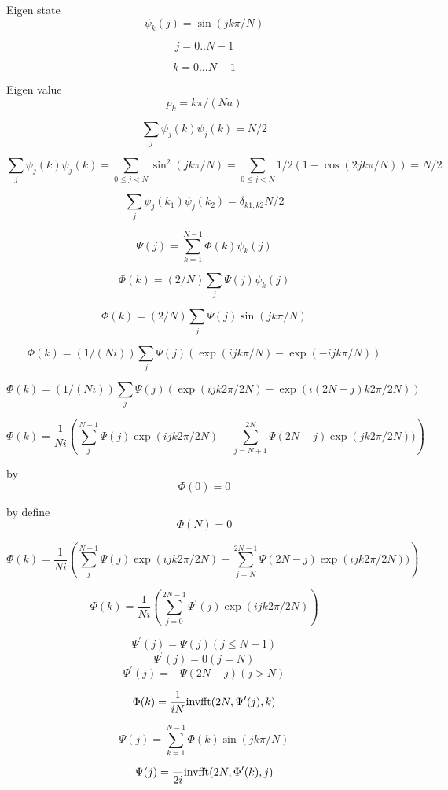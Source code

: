 \documentclass[12pt,twoside]{article}
\begin{document}
Eigen state
$$
\psi_k(j) = \sin(jk\pi/N)
$$

$$
j=0..N-1
$$

$$
k=0...N-1
$$

Eigen value
$$
p_k = k\pi/(N a)
$$

$$
\sum_j \psi_j(k)\psi_j(k) = N/2
$$

$$
\sum_j \psi_j(k)\psi_j(k) = 
\sum_{0 \le j<N}\sin^2(jk\pi/N)
=\sum_{0\le j<N}1/2(1-\cos(2jk\pi/N))
=N/2
$$

$$
\sum_j \psi_j(k_1)\psi_j(k_2) = \delta_{k1,k2} N/2
$$


$$
\Psi(j) = \sum_{k=1}^{N-1} \Phi(k) \psi_k(j)
$$

$$
\Phi(k) = (2/N) \sum_j \Psi(j) \psi_k(j)
$$

$$
\Phi(k) = (2/N) \sum_j \Psi(j) \sin(jk\pi/N)
$$

$$
\Phi(k) = (1/(Ni)) \sum_j \Psi(j) (\exp(ijk\pi/N) - \exp(-ijk\pi/N))
$$

$$
\Phi(k) = (1/(Ni)) \sum_j \Psi(j) (\exp(ijk2\pi/2N) - \exp(i(2N-j)k2\pi/2N))
$$

$$
\Phi(k) = \frac{1}{Ni}\left(\sum_j^{N-1} \Psi(j)\exp(ijk2\pi/2N) - \sum_{j=N+1}^{2N} \Psi(2N-j)\exp(jk2\pi/2N))\right)
$$

by
$$
\Phi(0)=0
$$

by define
$$
\Phi(N)=0
$$

$$
\Phi(k) = \frac{1}{Ni}\left(\sum_j^{N-1} \Psi(j)\exp(ijk2\pi/2N) - \sum_{j=N}^{2N-1} \Psi(2N-j)\exp(ijk2\pi/2N))\right)
$$

$$
\Phi(k) = \frac{1}{Ni}\left(\sum_{j=0}^{2N-1} \Psi^\prime(j)\exp(ijk2\pi/2N)\right)
$$

$$
\Psi^\prime(j) = \Psi(j) (j \le N-1)
$$
$$
\Psi^\prime(j) = 0 (j = N)
$$
$$
\Psi^\prime(j) = -\Psi(2N-j) (j > N)
$$

$$
\Phi(k) = \frac{1}{iN} {\rm inv fft}(2N, \Psi^\prime(j), k)
$$


$$
\Psi(j) = \sum_{k=1}^{N-1} \Phi(k) \sin(jk\pi/N)
$$

$$
\Psi(j) = \frac{}{2i} {\rm inv fft}(2N, \Phi^\prime(k), j)
$$
\end{document}
